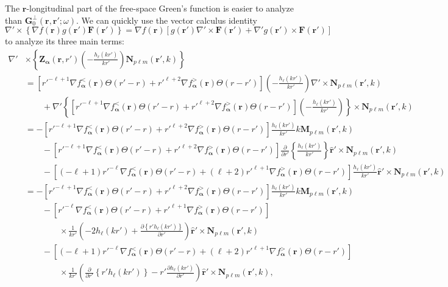 \documentclass{article}
\begin{document}
The $\mathbf{r}$-longitudinal part of the free-space Green's function is easier to analyze than $\mathbf{G}_0^\perp(\mathbf{r},\mathbf{r}';\omega)$. We can quickly use the vector calculus identity $\nabla'\times\left\{\nabla f(\mathbf{r})g(\mathbf{r}')\mathbf{F}(\mathbf{r}')\right\} = \nabla f(\mathbf{r})\left[g(\mathbf{r}')\nabla'\times\mathbf{F}(\mathbf{r}') + \nabla'g(\mathbf{r}')\times\mathbf{F}(\mathbf{r}')\right]$ to analyze its three main terms:
\begin{equation}
\begin{split}
\nabla'&\times\left\{\mathbf{Z}_{\bm{\alpha}}(\mathbf{r},r')\left(-\frac{h_\ell(kr')}{kr'}\right)\mathbf{N}_{p\ell m}(\mathbf{r}',k)\right\}\\
&= \left[r'^{-\ell + 1}\nabla f_{\bm{\alpha}}^<(\mathbf{r})\Theta(r' - r) + r'^{\ell + 2}\nabla f_{\bm{\alpha}}^>(\mathbf{r})\Theta(r - r')\right]\left(-\frac{h_\ell(kr')}{kr'}\right)\nabla'\times\mathbf{N}_{p\ell m}(\mathbf{r}',k)\\
&\qquad+ \nabla'\left\{\left[r'^{-\ell + 1}\nabla f_{\bm{\alpha}}^<(\mathbf{r})\Theta(r' - r) + r'^{\ell + 2}\nabla f_{\bm{\alpha}}^>(\mathbf{r})\Theta(r - r')\right]\left(-\frac{h_\ell(kr')}{kr'}\right)\right\}\times\mathbf{N}_{p\ell m}(\mathbf{r}',k)\\
&= -\left[r'^{-\ell + 1}\nabla f_{\bm{\alpha}}^<(\mathbf{r})\Theta(r' - r) + r'^{\ell + 2}\nabla f_{\bm{\alpha}}^>(\mathbf{r})\Theta(r - r')\right]\frac{h_\ell(kr')}{kr'}k\mathbf{M}_{p\ell m}(\mathbf{r}',k)\\
&\qquad - \left[r'^{-\ell + 1}\nabla f_{\bm{\alpha}}^<(\mathbf{r})\Theta(r' - r) + r'^{\ell + 2}\nabla f_{\bm{\alpha}}^>(\mathbf{r})\Theta(r - r')\right]\frac{\partial}{\partial r'}\left\{\frac{h_\ell(kr')}{kr'}\right\}\hat{\mathbf{r}}'\times\mathbf{N}_{p\ell m}(\mathbf{r}',k)\\
&\qquad - \left[(-\ell + 1)r'^{-\ell}\nabla f_{\bm{\alpha}}^<(\mathbf{r})\Theta(r' - r) + (\ell + 2)r'^{\ell + 1}\nabla f_{\bm{\alpha}}^>(\mathbf{r})\Theta(r - r')\right]\frac{h_\ell(kr')}{kr'}\hat{\mathbf{r}}'\times\mathbf{N}_{p\ell m}(\mathbf{r}',k)\\
&= -\left[r'^{-\ell + 1}\nabla f_{\bm{\alpha}}^<(\mathbf{r})\Theta(r' - r) + r'^{\ell + 2}\nabla f_{\bm{\alpha}}^>(\mathbf{r})\Theta(r - r')\right]\frac{h_\ell(kr')}{kr'}k\mathbf{M}_{p\ell m}(\mathbf{r}',k)\\
&\qquad - \left[r'^{-\ell}\nabla f_{\bm{\alpha}}^<(\mathbf{r})\Theta(r' - r) + r'^{\ell + 1}\nabla f_{\bm{\alpha}}^>(\mathbf{r})\Theta(r - r')\right]\\
&\qquad\qquad\times\frac{1}{kr'}\left(-2h_\ell(kr') + \frac{\partial\left\{r'h_\ell(kr')\right\}}{\partial r'}\right)\hat{\mathbf{r}}'\times\mathbf{N}_{p\ell m}(\mathbf{r}',k)\\
&\qquad - \left[(-\ell + 1)r'^{-\ell}\nabla f_{\bm{\alpha}}^<(\mathbf{r})\Theta(r' - r) + (\ell + 2)r'^{\ell + 1}\nabla f_{\bm{\alpha}}^>(\mathbf{r})\Theta(r - r')\right]\\
&\qquad\qquad\times\frac{1}{kr'}\left(\frac{\partial}{\partial r'}\left\{r'h_\ell(kr')\right\} - r'\frac{\partial h_\ell(kr')}{\partial r'}\right)\hat{\mathbf{r}}'\times\mathbf{N}_{p\ell m}(\mathbf{r}',k),
\end{split}
\end{equation}
\end{document}
